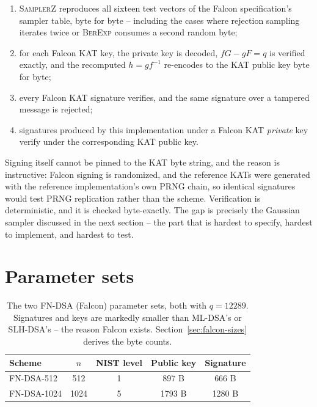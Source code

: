 \begin{enumerate}
  \item \textsc{SamplerZ} reproduces all sixteen test vectors of the Falcon
        specification's sampler table, byte for byte -- including the cases
        where rejection sampling iterates twice or \textsc{BerExp} consumes a
        second random byte;
  \item for each Falcon KAT key, the private key is decoded, $fG-gF=q$ is
        verified exactly, and the recomputed $h=g f^{-1}$ re-encodes to the
        KAT public key byte for byte;
  \item every Falcon KAT signature verifies, and the same signature over a
        tampered message is rejected;
  \item signatures produced by this implementation under a Falcon KAT
        \emph{private} key verify under the corresponding KAT public key.
\end{enumerate}

Signing itself cannot be pinned to the KAT byte string, and the reason is
instructive: Falcon signing is randomized, and the reference KATs were
generated with the reference implementation's own PRNG chain, so identical
signatures would test PRNG replication rather than the scheme. Verification
is deterministic, and it is checked byte-exactly. The gap is precisely the
Gaussian sampler discussed in the next section -- the part that is hardest to
specify, hardest to implement, and hardest to test.

\section{Parameter sets}
\label{sec:falcon-params}

\begin{table}[H]
\centering
\begin{tabular}{lcccc}
\toprule
Scheme & $n$ & NIST level & Public key & Signature \\
\midrule
FN-DSA-512  & 512  & 1 & 897 B & 666 B \\
FN-DSA-1024 & 1024 & 5 & 1793 B & 1280 B \\
\bottomrule
\end{tabular}
\caption{The two FN-DSA (Falcon) parameter sets, both with $q=12289$. Signatures and keys are markedly smaller than ML-DSA's or SLH-DSA's -- the reason Falcon exists. Section~\ref{sec:falcon-sizes} derives the byte counts.}
\end{table}


